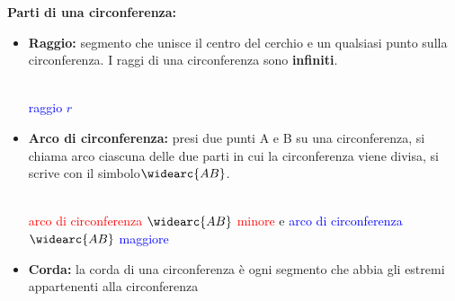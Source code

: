 \documentclass[14pt]{extarticle}
\begin{document}
\textbf{Parti di una circonferenza:}\\
\begin{itemize}
    \item \textbf{Raggio:} segmento che unisce il centro del cerchio e un qualsiasi punto sulla circonferenza. I raggi di una circonferenza sono \textbf{infiniti}.
        \begin{center}
            \\
        \textcolor{blue}{raggio \(r\)}
        \end{center}
    \item \textbf{Arco di circonferenza:} presi due punti A e B su una circonferenza, si chiama arco ciascuna delle due parti in cui la circonferenza viene divisa, si scrive con il simbolo\(\widearc{AB}\).\\
        \begin{center}
            \\
        \textcolor{red}{arco di circonferenza \(\widearc{AB}\) minore} e \textcolor{blue}{arco di circonferenza \(\widearc{AB}\) maggiore}
        \end{center}
    \item \textbf{Corda:} la corda di una circonferenza è ogni segmento che abbia gli estremi appartenenti alla circonferenza\\
        \begin{center} %

\end{center}
\end{itemize}
\end{document}
